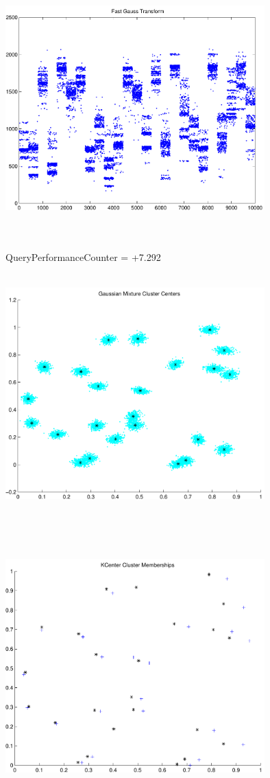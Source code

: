 \documentclass[9pt]{article}
\theoremstyle{plain}
\theoremstyle{definition}
\theoremstyle{remark}
\numberwithin{equation}{section}
\begin{document}
\includegraphics[width=10.0cm,height=10.0cm]{FGT25_Centers.pdf}

QueryPerformanceCounter  =  +7.292
\includegraphics[width=10.0cm,height=10.0cm]{GaussianMixture_ClusterCenters24_Centers.pdf}

\includegraphics[width=10.0cm,height=10.0cm]{KCenterClusterMemberships_24_Centers.pdf}
\end{document}
